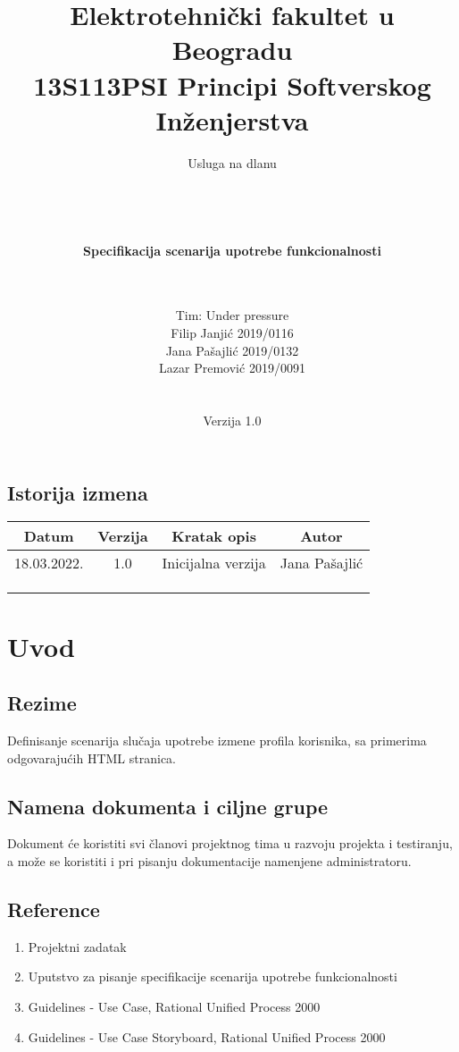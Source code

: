 \documentclass[a4paper,12pt]{report}
\title{\Large Elektrotehnički fakultet u Beogradu \\ 13S113PSI Principi Softverskog Inženjerstva}
\author{\Huge Usluga na dlanu\\ \ \\ \ \\ \ \\ \ \\
	\Large \textbf{Specifikacija scenarija upotrebe funkcionalnosti}\\\Large \textbf{\genitivfunkcionalnosti} \\ \ \\}
\date{\Large   Tim: Under pressure \\ Filip Janjić 2019/0116 \\ Jana Pašajlić 2019/0132 \\ Lazar Premović 2019/0091  \\ \  \\ \  \\\large Verzija 1.0}
\newcommand{\inicijalniautor}{Jana Pašajlić}
\newcommand{\inicijalnidatum}{18.03.2022.}
\begin{document}
\maketitle

\begin{center}
\section*{Istorija izmena}
\begin{tabular}{ |c|c|c|c| }
\hline
\textbf{Datum} & \textbf{Verzija} & \textbf{Kratak opis} & \textbf{Autor} \\ 
\hline
 \inicijalnidatum & 1.0  & Inicijalna verzija & \inicijalniautor \\
 \hline
 &  & &  \\
 \hline
 &  &  &  \\
 \hline
 &  &  &  \\
 \hline
\end{tabular}
\end{center}
\newpage

\tableofcontents

\newpage
\section{Uvod}
\subsection{Rezime}
    Definisanje scenarija slučaja upotrebe izmene profila korisnika, sa primerima odgovarajućih HTML stranica.
\subsection{Namena dokumenta i ciljne grupe}
    Dokument će koristiti svi članovi projektnog tima u razvoju projekta i testiranju, a može se koristiti i pri pisanju dokumentacije namenjene administratoru.
\subsection{Reference}
 \begin{enumerate}
    \item Projektni zadatak
    \item Uputstvo za pisanje specifikacije scenarija upotrebe funkcionalnosti 
    \item Guidelines - Use Case, Rational Unified Process 2000
    \item Guidelines - Use Case Storyboard, Rational Unified Process 2000
 \end{enumerate}
\end{document}
